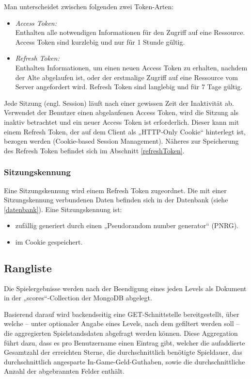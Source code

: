 \documentclass[letterpaper, 10 pt, conference]{ieeeconf}
\begin{document}
Man unterscheidet zwischen folgenden zwei Token-Arten:

\begin{itemize}
\item 
\textit{Access Token:}\\
Enthalten alle notwendigen Informationen für den Zugriff auf eine Ressource.  Access Token sind kurzlebig und nur für 1 Stunde gültig.
\item 
\textit{Refresh Token:}\\
Enthalten Informationen, um einen neuen Access Token zu erhalten, nachdem der Alte abgelaufen ist, oder der erstmalige Zugriff auf eine Ressource vom Server angefordert wird.  Refresh Token sind langlebig und für 7 Tage gültig.
\end{itemize}

Jede Sitzung (engl. Session) läuft nach einer gewissen Zeit der Inaktivität ab. 
Verwendet der Benutzer einen abgelaufenen Access Token, wird die Sitzung als inaktiv betrachtet und ein neuer Access Token ist erforderlich.  Dieser kann mit einem Refresh Token, der auf dem Client als „HTTP-Only Cookie“ hinterlegt ist, bezogen werden (Cookie-based Session Management). Näheres zur Speicherung des Refresh Token befindet sich im Abschnitt \ref{refreshToken}.

\subsubsection{Sitzungskennung}

Eine Sitzungskennung wird einem Refresh Token zugeordnet. Die mit einer Sitzungskennung verbundenen Daten befinden sich in der Datenbank (siehe \ref{datenbank}). Eine Sitzungskennung ist:

\begin{itemize}
\item zufällig generiert durch einen „Pseudorandom number generator“ (PNRG).
\item im Cookie gespeichert.
\end{itemize}

\subsection{Rangliste}

Die Spielergebnisse werden nach der Beendigung eines jeden Levels als Dokument in der „scores“-Collection der MongoDB abgelegt.

Basierend darauf wird backendseitig eine GET-Schnittstelle bereitgestellt,
über welche – unter optionaler Angabe eines Levels, nach dem gefiltert werden soll – die aggregierten Spielstandsdaten abgefragt werden können.
Diese Aggregation führt dazu, dass es pro Benutzername einen Eintrag gibt, welcher die aufaddierte Gesamtzahl der erreichten Sterne,
die durchschnittlich benötigte Spieldauer, das durchschnittlich angesparte In-Game-Geld-Guthaben, sowie die durchschnittliche Anzahl der abgebrannten Felder enthält.
\end{document}
